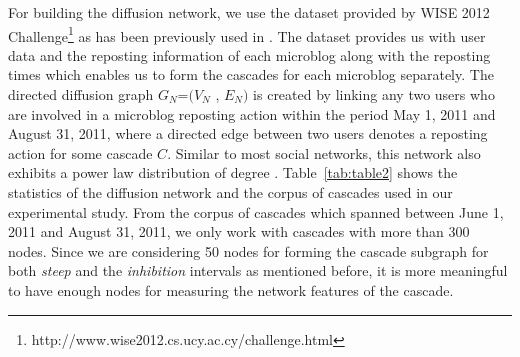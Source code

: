 \documentclass[smallextended]{svjour3}       %
\theoremstyle{definition}
\begin{document}
For building the diffusion network, we use the dataset provided by WISE 2012 Challenge\footnote{http://www.wise2012.cs.ucy.ac.cy/challenge.html} as has been previously used  in \cite{guo_cascade}. The dataset provides us with user data and the reposting information of each microblog along with the reposting times which enables us to form the cascades for each microblog separately. The directed diffusion graph $G_N$=$(V_N$ , $E_N)$ is created by linking any two users who are involved in a microblog reposting action within the period May 1, 2011 and August 31, 2011, where a directed edge between two users denotes a reposting action for some cascade $C$.  Similar to most social networks, this network also exhibits a power law distribution of degree \cite{guo_cascade}. Table~\ref{tab:table2} shows the statistics of the diffusion network and the corpus of cascades used in our experimental study. From the corpus of cascades which spanned between June 1, 2011 and August 31, 2011, we only work with cascades with more than 300 nodes. Since we are considering 50 nodes for forming the cascade subgraph for both \textit{steep} and the \textit{inhibition} intervals as mentioned before, it is more meaningful to have enough nodes for measuring the network features of the cascade. 
\end{document}
